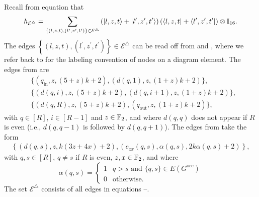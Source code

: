 \documentclass[../thesis-main/thesis-main]{subfiles}
\begin{document}
Recall from equation  that
\begin{align}
  h_{\mathcal{E}^{\triangle}}=\sum_{\left\{ (l,z,t),(l^{\prime},z^{\prime},t^{\prime})\right\} \in\mathcal{E}^{\triangle}}\left(|l,z,t\rangle+|l^{\prime},z^{\prime},t^{\prime}\rangle\right)\left(\langle l,z,t|+\langle l^{\prime},z^{\prime},t^{\prime}|\right)\otimes\mathbb{I}_{16}.\label{eq:equation_for_h_epsilon_triangle}
\end{align}
The edges $\left\{ (l,z,t),(l^{\prime},z^{\prime},t^{\prime})\right\} \in\mathcal{E}^{\triangle}$ can be read off from  and ,  where we refer back to  for the labeling convention of nodes on a diagram element. The edges from  are
\begin{align}
  &\big\{ (q_{\mathrm{in}},z,(5+z)k+2),(d(q,1),z,(1+z)k+2)\big\}, \label{eq:epsilon_triangle_set1_1}\\
  &\big\{ (d(q,i),z,(5+z)k+2),(d(q,i+1),z,(1+z)k+2)\big\}, \label{eq:epsilon_triangle_set1_2}\\
  & \big\{ (d(q,R),z,(5+z)k+2),(q_{\mathrm{out}},z,(1+z)k+2)\big\}, \label{eq:epsilon_triangle_set1_3}
\end{align}
with $q\in[R]$, $i\in [R-1]$ and $z\in \mathbb{F}_2$, and where $d(q,q)$ does not appear if $R$ is even (i.e., $d(q,q-1)$ is followed by $d(q,q+1)$). The edges from  take the form  
\begin{align}
  \left\{ \left(d(q,s),z,k(3z + 4 x)+2 \right),(e_{zx}(q,s),\alpha(q,s),2 k \alpha(q,s)+2)\right\}, \label{eq:epsilon_triangle_set2}
\end{align}
with $q,s\in[R]$, $q\neq s$ if $R$ is even, $z,x\in \mathbb{F}_2$, 
and where
\begin{equation}
  \alpha(q,s)=\begin{cases}
      1 & q>s \text{ and } \{q,s\}\in E(G^{\text{occ}})\\
      0 & \text{otherwise}.
    \end{cases}
\end{equation}
The set $\mathcal{E}^{\triangle}$ consists of all edges in equations --.
\end{document}
